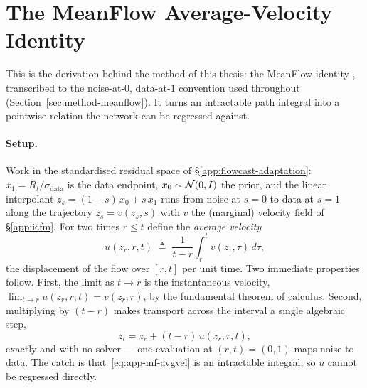\section{The MeanFlow Average-Velocity Identity}
\label{app:meanflow-identity}

This is the derivation behind the method of this thesis: the MeanFlow identity \citep{geng2025meanflow}, transcribed to the noise-at-$0$, data-at-$1$ convention used throughout (Section~\ref{sec:method-meanflow}). It turns an intractable path integral into a pointwise relation the network can be regressed against.

\paragraph{Setup.} Work in the standardised residual space of \S\ref{app:flowcast-adaptation}: $x_1 = R_t/\sigma_{\text{data}}$ is the data endpoint, $x_0 \sim \mathcal{N}(0, I)$ the prior, and the linear interpolant $z_s = (1 - s)\,x_0 + s\,x_1$ runs from noise at $s = 0$ to data at $s = 1$ along the trajectory $\dot z_s = v(z_s, s)$ with $v$ the (marginal) velocity field of \S\ref{app:icfm}. For two times $r \le t$ define the \emph{average velocity}
\begin{equation}
  u(z_r, r, t) \;\triangleq\; \frac{1}{t - r}\int_r^t v(z_\tau, \tau)\, d\tau,
  \label{eq:app-mf-avgvel}
\end{equation}
the displacement of the flow over $[r, t]$ per unit time. Two immediate properties follow. First, the limit as $t \to r$ is the instantaneous velocity, $\lim_{t \to r} u(z_r, r, t) = v(z_r, r)$, by the fundamental theorem of calculus. Second, multiplying by $(t-r)$ makes transport across the interval a single algebraic step,
\begin{equation}
  z_t = z_r + (t - r)\, u(z_r, r, t),
  \label{eq:app-mf-displacement}
\end{equation}
exactly and with no solver --- one evaluation at $(r, t) = (0, 1)$ maps noise to data. The catch is that~\eqref{eq:app-mf-avgvel} is an intractable integral, so $u$ cannot be regressed directly.

